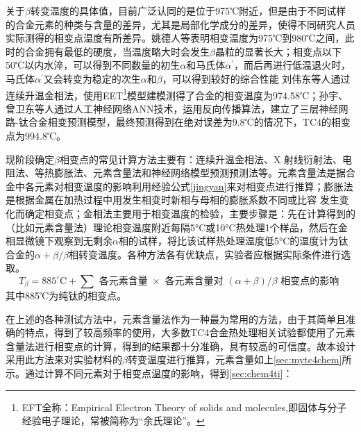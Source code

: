 关于$\beta$转变温度的具体值，目前广泛认同的是位于975℃附近，但是由于不同试样的合金元素的种类与含量的差异，尤其是局部化学成分的差异，使得不同研究人员实际测得的相变点温度有所差异\cite{wangtaoTC4hejinxiangbianwendujiancezhongjieguobuyizhiyuanyinfenxi2013}。姚德人等\cite{yaoderenTc4taihejinxiangbiandiandeceding1975}表明相变温度为975℃到980℃之间，此时的合金拥有最低的硬度，当温度略大时会发生$\beta$晶粒的显著长大；相变点以下50℃以内水淬，可以得到不同数量的初生$ \alpha $和马氏体$ \alpha^{\prime} $，而后再进行低温退火时，马氏体$ \alpha^{\prime} $又会转变为稳定的次生$ \alpha$和$ \beta $，可以得到较好的综合性能%
刘伟东等人\cite{liuweidongTC4hejinVzhuanbianwendudejinxiangfacedingyulilunjisuan2014}通过连续升温金相法，使用EET\footnote{EFT全称：Empirical Electron Theory of solids and molecules,即固体与分子经验电子理论，常被简称为“余氏理论”。}模型建模测得了\ti 合金的相变温度为974.58℃；孙宇、曾卫东等人\cite{sunyuYingyongrengongshenjingwangluoyanjiuhuaxueyuansuduitaihejinxiangbiandiandeyingxiang2010}通过人工神经网络ANN技术，运用反向传播算法，建立了三层神经网路-钛合金相变预测模型，最终预测得到在绝对误差为9.8℃的情况下，TC4的相变点为994.8℃。

现阶段确定$ \beta $相变点的常见计算方法\cite{zhuhongTaihejinaVxiangbiandiandejizhongceshifangfatantao2013}主要有：连续升温金相法、X 射线衍射法、电阻法、等热膨胀法、元素含量法和神经网络模型预测预测法\cite{renchiqiangGurongshixiaoduiTC4taihejinxianweizuzhihelixuexingnengdeyingxiang2022}等。元素含量法是据合金中各元素对相变温度的影响\cite{ananyaLocationBasedIntelligent2011}利用经验公式\ref{jingyan}来对相变点进行推算；膨胀法是根据金属在加热过程中用发生相变时新相与母相的膨胀系数不同或比容 发生变化而确定相变点；金相法主要用于相变温度的检验，主要步骤是：先在计算得到的（比如元素含量法）理论相变温度附近每隔5°C或10°C热处理1个样品，然后在金相显微镜下观察到无剩余$\alpha$相的试样，将比该试样热处理温度低5°C的温度计为钛合金的$\alpha+\beta/\beta$相转变温度。各种方法各有优缺点，实验者应根据实际条件进行选取。
\begin{equation}
	T_\beta=885^{\circ} \mathrm{C}+\sum \textit{ 各元素含量 } \times \textit{ 各元素含量对 }(\alpha+\beta) / \beta \textit{ 相变点的影响 }
	\label{jingyan}
\end{equation}
其中885℃为纯钛的相变点。

在上述的各种测试方法中，元素含量法作为一种最为常用的方法，由于其简单且准确的特点，得到了较高频率的使用，大多数TC4合金热处理相关试验都使用了元素含量法进行相变点的计算\cite{LiuLeiTi6Al4VTaiHeJinBuTongReChuLiFangFaDeShiYanYuFuHeCaiLiaoLiXueXingNengFenXi2022,zouhaibeiTC4taihejinrechuliqianghuagongyijixiangbianhangweiyanjiu2019,liutaoRechuliduiTC4taihejindongtailixuexingnengheweiguanzuzhideyingxiang,baoxuechunRechuligongyiduiTC4taihejinzuzhihelixuexingnengdeyingxiang2019,wangpuqiangButongrechuligongyixiajiguangzengcaizhizaoTC4taihejinzuzhiyuxingnengyanjiujinzhan2020}，得到的结果都十分准确，具有较高的可信度。故本设计采用此方法来对实验材料的$\beta$转变温度进行推算，元素含量如上\ref{sec:mytc4chem}所示。通过计算不同元素对于相变点温度的影响，得到\ref{sec:chem4ti}：

